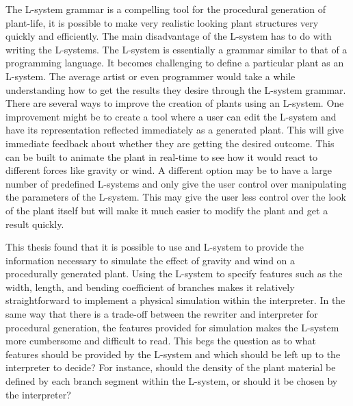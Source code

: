 The L-system grammar is a compelling tool for the procedural generation of plant-life, it is possible to make very realistic looking plant structures very quickly and efficiently. The main disadvantage of the L-system has to do with writing the L-systems. The L-system is essentially a grammar similar to that of a programming language. It becomes challenging to define a particular plant as an L-system. The average artist or even programmer would take a while understanding how to get the results they desire through the L-system grammar. There are several ways to improve the creation of plants using an L-system. One improvement might be to create a tool where a user can edit the L-system and have its representation reflected immediately as a generated plant. This will give immediate feedback about whether they are getting the desired outcome. This can be built to animate the plant in real-time to see how it would react to different forces like gravity or wind. A different option may be to have a large number of predefined L-systems and only give the user control over manipulating the parameters of the L-system. This may give the user less control over the look of the plant itself but will make it much easier to modify the plant and get a result quickly.

This thesis found that it is possible to use and L-system to provide the information necessary to simulate the effect of gravity and wind on a procedurally generated plant. Using the L-system to specify features such as the width, length, and bending coefficient of branches makes it relatively straightforward to implement a physical simulation within the interpreter. In the same way that there is a trade-off between the rewriter and interpreter for procedural generation, the features provided for simulation makes the L-system more cumbersome and difficult to read. This begs the question as to what features should be provided by the L-system and which should be left up to the interpreter to decide? For instance, should the density of the plant material be defined by each branch segment within the L-system, or should it be chosen by the interpreter? 
